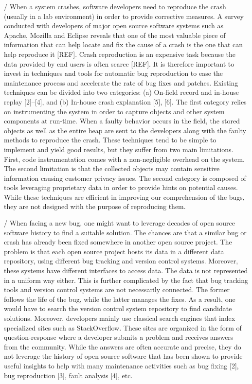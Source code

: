 /%
When a system crashes, software developers need to reproduce the crash (usually in a lab environment) in order to provide corrective measures.  A survey conducted with developers of major open source software systems such as Apache, Mozilla and Eclipse reveals that one of the most valuable piece of information that can help locate and fix the cause of a crash is the one that can help reproduce it [REF]. Crash reproduction is  an expensive task because the data provided by end users is often scarce [REF]. It is therefore important to invest in techniques and tools for automatic bug reproduction to ease the maintenance process and accelerate the rate of bug fixes and patches. Existing techniques can be divided into two categories: (a) On-field record and in-house replay [2]–[4], and (b) In-house crash explanation [5], [6]. The first category relies on instrumenting the system in order to capture objects and other system components at run-time. When a faulty behavior occurs in the field, the stored objects as well as the entire heap are sent to the developers along with the faulty methods to reproduce the crash. These techniques tend to be simple to implement and yield good results, but they suffer from two main limitations. First, code instrumentation comes with a non-negligible overhead on the system. The second limitation is that the collected objects may contain sensitive information causing customer privacy issues. The second category is composed of tools leveraging proprietary data in order to provide hints on potential causes. While these techniques are efficient in improving our comprehension of the bugs, they are not designed with the purpose of reproducing them. 

/%
When facing a new bug, one might want to leverage decades of open source software history to find a suitable solution. The
chances are that a similar bug or crash has already been fixed somewhere  in  another  open  source  project.  The  problem  is
that each open source project hosts its data in a different data repository,  using  different  bug  tracking  and  version  control systems.  Moreover,  these  systems  have  different  interfaces to  access  data.  The  data  is  not  represented  in  a  uniform way  either.  This  is  further  complicated  by  the  fact  that  bug tracking tools and version control systems are not necessarily connected.  The  former  follows  the  life  of  the  bug,  while  the latter  manages  the  fixes.  As  a  result,  one  would  have  to search the version control system repository to find candidate
solutions. Moreover,  developers  mainly  use  classical  search  engines that  index  specialized  sites  such  as  StackOverflow. These sites  are  organized  in  the  form  of  question-response  where a developer submits a problem and receives answers from the community. While the answers are often accurate and precise, they do not leverage the history of open source software that has been shown to provide useful insights to help with many maintenance activities such as bug fixing [2], bug reproduction [3], fault analysis [4], etc.


